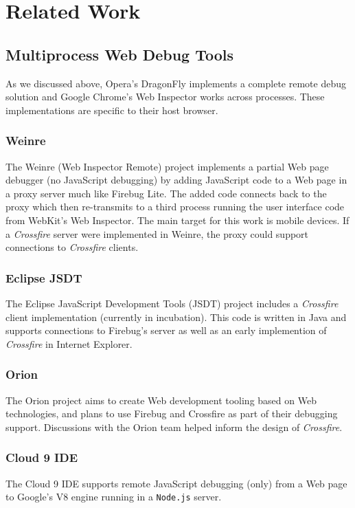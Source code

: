 
\section{Related Work}
\subsection{Multiprocess Web Debug Tools}
As we discussed above, 
Opera's DragonFly\cite{dragonfly} implements a complete remote debug solution and 
Google Chrome's Web Inspector works across processes. These implementations are specific to their host browser.


\subsubsection{Weinre}
The Weinre (Web Inspector Remote)\cite{weinre} project implements a partial Web page debugger (no JavaScript debugging) by 
adding JavaScript code to a Web page in a proxy server much like Firebug Lite. The 
added code connects back to the proxy which then re-transmits to a third process running
the user interface code
from WebKit's Web Inspector. The main target for this work is mobile devices. If 
a \textit{Crossfire} server were implemented in Weinre, the proxy could support connections to 
 \textit{Crossfire} clients.

\subsubsection{Eclipse JSDT}
The Eclipse JavaScript Development Tools (JSDT) project\cite{EclipseJSDT}
includes a \textit{Crossfire} client implementation (currently in incubation).
 This code is written in Java and supports
connections to Firebug's server as well as an early implemention of \textit{Crossfire} in Internet Explorer.

\subsubsection{Orion}
The Orion project\cite{orion} aims to create Web development tooling based on
Web technologies, and plans to use Firebug and Crossfire as part of their
debugging support. Discussions with the Orion team helped inform the design of \textit{Crossfire}.

\subsubsection{Cloud 9 IDE}
The Cloud 9 IDE\cite{cloud9} supports remote JavaScript debugging (only) from a Web page to Google's V8 
engine running in a \texttt{Node.js} server. 

